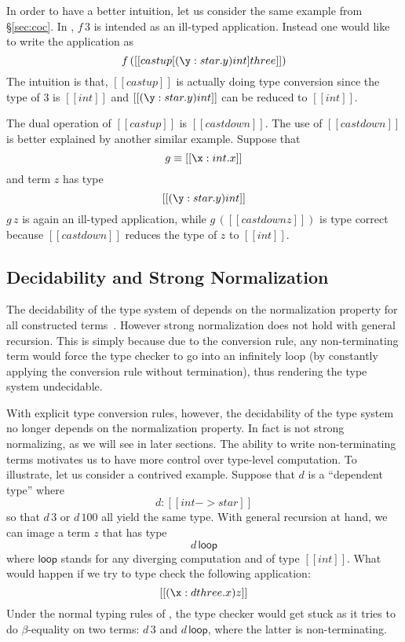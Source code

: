In order to have a better intuition, let us consider the same example from \S\ref{sec:coc}. In \name, $f\,3$ is intended as an ill-typed application. Instead one would like to write the application as \[ f\,([[castup[(\y:star.y)int]three]]) \] The intuition is that, $[[castup]]$ is actually doing type conversion since the type of $ 3 $ is $ [[int]] $ and $ [[(\y:star.y)int]] $ can be reduced to $ [[int]] $.

The dual operation of $[[castup]]$ is $[[castdown]]$. The use of $[[castdown]]$ is better explained by another similar example. Suppose that \[ g \equiv [[\x:int.x]] \] and term $z$ has type \[ [[(\y:star.y)int]] \] $ g\,z $ is again an ill-typed application, while $ g\,([[castdown z]]) $ is type correct because $[[castdown]]$ reduces the type of $ z $ to $ [[int]] $.

\subsection{Decidability and Strong Normalization}


The decidability of the type system of \coc depends on the normalization property for all constructed terms~\cite{coc:decidability}. However strong normalization does not hold with general recursion. This is simply because due to the conversion rule, any non-terminating term would force the type checker to go into an infinitely loop (by constantly applying the conversion rule without termination), thus rendering the type system undecidable.

With explicit type conversion rules, however, the decidability of the type system no longer depends on the normalization property. In fact \name is not strong normalizing, as we will see in later sections. The ability to write non-terminating terms motivates us to have more control over type-level computation. To illustrate, let us consider a contrived example. Suppose that $d$ is a ``dependent type'' where \[d : [[int -> star]]\] so that $d\,3$ or $d\,100$ all yield the same type.  With general recursion at hand, we can image  a term $z$ that has type \[d\,\mathsf{loop}\] where $\mathsf{loop}$ stands for any diverging computation and of type $[[int]]$. What would happen if we try to type check the following application: \[ [[(\x: d three.x)z]]\] Under the normal typing rules of \coc, the type checker would get stuck as it tries to do $\beta$-equality on two terms: $d\,3$ and $d\,\mathsf{loop}$, where the latter is non-terminating.

